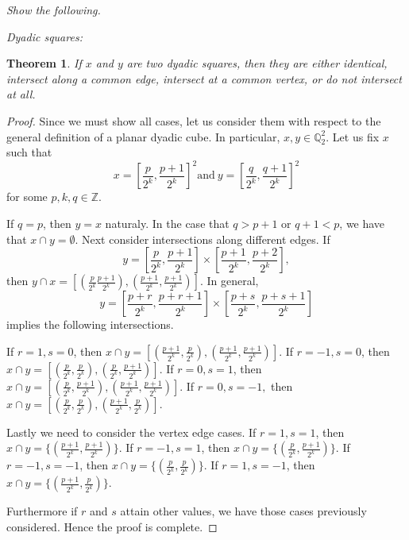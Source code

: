 \documentclass[letter]{article}
\newtheorem{theorem}{Theorem}
\newenvironment{menumerate}{%
  \edef\backupindent{\the\parindent}%
  \enumerate%
  \setlength{\parindent}{\backupindent}%
}{\endenumerate}
\begin{document}
\begin{menumerate}
	\item \textit{Show the following.} 
		\begin{menumerate}
			\item \textit{Dyadic squares:}
				\begin{theorem}
					 If $x$ and $y$ are two dyadic squares, then they are either identical, intersect along a common edge, intersect at a common vertex, or do not intersect at all.
				\end{theorem}
				\begin{proof}
					Since we must show all cases, let us consider them with respect to the general definition of a planar dyadic cube. In particular, $x,y \in \mathbb{Q}_2^2.$ Let us fix $x$ such that
					$$x = \left[\frac{p}{2^k}, \frac{p+1}{2^k}\right]^2 \mathrm{and}\ y = \left[\frac{q}{2^k}, \frac{q+1}{2^k}\right]^2$$
					for some $p, k, q \in \mathbb{Z}.$

					If $q = p$, then $y = x$ naturaly. In the case that $q > p+1$ or $q+1 < p$, we have that $x \cap y = \emptyset$. Next consider intersections along different edges. If
					 $$y = \left[\frac{p}{2^k}, \frac{p+1}{2^k}\right]\times \left[\frac{p+1}{2^k}, \frac{p+2}{2^k}\right],$$
					 then $y \cap x = [(\frac{p}{2^k}\frac{p+1}{2^k}), (\frac{p+1}{2^k},\frac{p+1}{2^k})]$. In general, 
					 $$y = \left[\frac{p+r}{2^k}, \frac{p+r+1}{2^k}\right]\times \left[\frac{p+s}{2^k}, \frac{p+s+1}{2^k}\right]$$
					 implies the following intersections.

					 If $r = 1, s = 0$, then $x \cap y = \left[(\frac{p+1}{2^k},\frac{p}{2^k}),(\frac{p+1}{2^k}, \frac{p+1}{2^k})\right]$. If $r = -1, s= 0$, then  $x \cap y = \left[(\frac{p}{2^k},\frac{p}{2^k}),(\frac{p}{2^k}, \frac{p+1}{2^k})\right].$ If $r= 0, s = 1$, then  $x \cap y = \left[(\frac{p}{2^k},\frac{p+1}{2^k}),(\frac{p+1}{2^k}, \frac{p+1}{2^k})\right]$. If $r=0,s=-1,$ then  $x \cap y = \left[(\frac{p}{2^k},\frac{p}{2^k}),(\frac{p+1}{2^k}, \frac{p}{2^k})\right]$.

					 Lastly we need to consider the vertex edge cases. If $r =1, s= 1$, then $x \cap y = \{(\frac{p+1}{2^k},\frac{p+1}{2^k})\}$. If $r =-1, s= 1$, then $x \cap y = \{(\frac{p}{2^k},\frac{p+1}{2^k})\}$. If $r =-1, s= -1$, then $x \cap y = \{(\frac{p}{2^k},\frac{p}{2^k})\}$. If $r =1, s= -1$, then $x \cap y = \{(\frac{p+1}{2^k},\frac{p}{2^k})\}$.  

					 Furthermore if $r$ and $s$ attain other values, we have those cases previously considered. Hence the proof is complete.


\end{proof}
\end{menumerate}
\end{menumerate}
\end{document}
